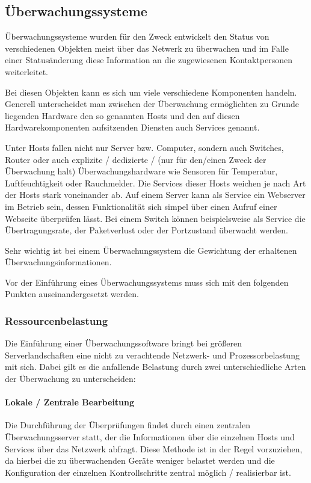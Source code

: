 \subsection{Überwachungssysteme}
\label{monitor}
Überwachungssysteme wurden für den Zweck entwickelt den Status von verschiedenen Objekten meist über das Netwerk zu überwachen und im Falle einer Statusänderung diese Information an die zugewiesenen Kontaktpersonen weiterleitet.

Bei diesen Objekten kann es sich um viele verschiedene Komponenten handeln.
Generell unterscheidet man zwischen der Überwachung ermöglichten zu Grunde liegenden Hardware den so genannten Hosts und den auf diesen Hardwarekomponenten aufsitzenden Diensten auch Services genannt.

Unter Hosts fallen nicht nur Server bzw. Computer, sondern auch Switches, Router oder auch explizite / dedizierte / (nur für den/einen Zweck der Überwachung halt) Überwachungshardware wie Sensoren für Temperatur, Luftfeuchtigkeit oder Rauchmelder.
Die Services dieser Hosts weichen je nach Art der Hosts stark voneinander ab.
Auf einem Server kann als Service ein Webserver im Betrieb sein, dessen Funktionalität sich simpel über einen Aufruf einer Webseite überprüfen lässt.
Bei einem Switch können beispielsweise als Service die Übertragungsrate, der Paketverlust oder der Portzustand überwacht werden.

Sehr wichtig ist bei einem Überwachungssystem die Gewichtung der erhaltenen Überwachungsinformationen.



Vor der Einführung eines Überwachungssystems muss sich mit den folgenden Punkten auseinandergesetzt werden.

\subsubsection{Ressourcenbelastung}
Die Einführung einer Überwachungssoftware bringt bei größeren Serverlandschaften eine nicht zu verachtende Netzwerk- und Prozessorbelastung mit sich.
Dabei gilt es die anfallende Belastung durch zwei unterschiedliche Arten der Überwachung zu unterscheiden:

\paragraph{Lokale / Zentrale Bearbeitung}
Die Durchführung der Überprüfungen findet durch einen zentralen Überwachungsserver statt, der die Informationen über die einzelnen Hosts und Services über das Netzwerk abfragt.
Diese Methode ist in der Regel vorzuziehen, da hierbei die zu überwachenden Geräte weniger belastet werden und die Konfiguration der einzelnen Kontrollschritte zentral möglich / realisierbar ist.

